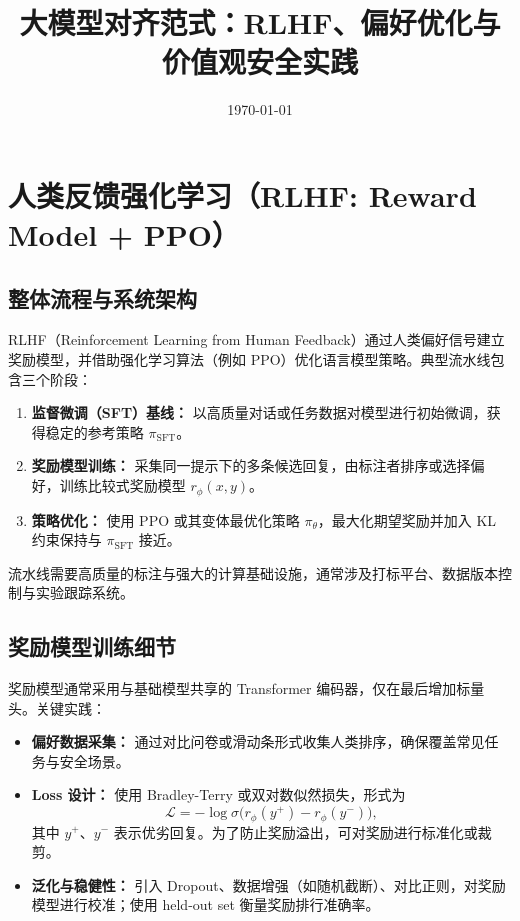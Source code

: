 \documentclass[UTF8,zihao=-4]{ctexart}
\title{大模型对齐范式：RLHF、偏好优化与价值观安全实践}
\author{}
\date{\today}
\begin{document}
\maketitle

\section{人类反馈强化学习（RLHF: Reward Model + PPO）}
\subsection{整体流程与系统架构}
RLHF（Reinforcement Learning from Human Feedback）通过人类偏好信号建立奖励模型，并借助强化学习算法（例如 PPO）优化语言模型策略。典型流水线包含三个阶段：
\begin{enumerate}
  \item \textbf{监督微调（SFT）基线：} 以高质量对话或任务数据对模型进行初始微调，获得稳定的参考策略 $\pi_{\text{SFT}}$。
  \item \textbf{奖励模型训练：} 采集同一提示下的多条候选回复，由标注者排序或选择偏好，训练比较式奖励模型 $r_\phi(x, y)$。
  \item \textbf{策略优化：} 使用 PPO 或其变体最优化策略 $\pi_\theta$，最大化期望奖励并加入 KL 约束保持与 $\pi_{\text{SFT}}$ 接近。
\end{enumerate}
流水线需要高质量的标注与强大的计算基础设施，通常涉及打标平台、数据版本控制与实验跟踪系统。

\subsection{奖励模型训练细节}
奖励模型通常采用与基础模型共享的 Transformer 编码器，仅在最后增加标量头。关键实践：
\begin{itemize}
  \item \textbf{偏好数据采集：} 通过对比问卷或滑动条形式收集人类排序，确保覆盖常见任务与安全场景。
  \item \textbf{Loss 设计：} 使用 Bradley-Terry 或双对数似然损失，形式为
  \begin{equation}
    \mathcal{L} = - \log \sigma\big(r_\phi(y^+) - r_\phi(y^-)\big),
  \end{equation}
  其中 $y^+$、$y^-$ 表示优劣回复。为了防止奖励溢出，可对奖励进行标准化或裁剪。
  \item \textbf{泛化与稳健性：} 引入 Dropout、数据增强（如随机截断）、对比正则，对奖励模型进行校准；使用 held-out set 衡量奖励排行准确率。
\end{itemize}
\end{document}
